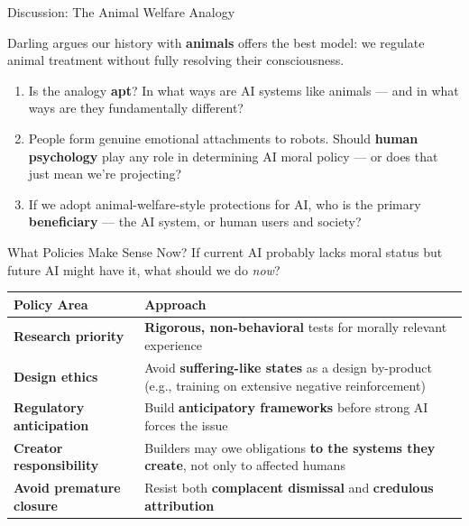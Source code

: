 \documentclass[aspectratio=169,11pt]{beamer}
\begin{document}
\begin{frame}{Discussion: The Animal Welfare Analogy}
\begin{discussionbox}[Discussion]
\small
Darling argues our history with \textbf{animals} offers the best model: we regulate animal treatment without fully resolving their consciousness.
\begin{enumerate}
    \item Is the analogy \textbf{apt}? In what ways are AI systems like animals --- and in what ways are they fundamentally different?
    \item People form genuine emotional attachments to robots. Should \textbf{human psychology} play any role in determining AI moral policy --- or does that just mean we're projecting?
    \item If we adopt animal-welfare-style protections for AI, who is the primary \textbf{beneficiary} --- the AI system, or human users and society?
\end{enumerate}
\end{discussionbox}
\end{frame}

\begin{frame}[shrink=8]{What Policies Make Sense Now?}
If current AI probably lacks moral status but future AI might have it, what should we do \emph{now}?

\begin{tabular}{@{}p{3.8cm}p{7.8cm}@{}}
\toprule
\textbf{Policy Area} & \textbf{Approach} \\
\midrule
\textbf{Research priority} & \textbf{Rigorous, non-behavioral} tests for morally relevant experience \\
\addlinespace
\textbf{Design ethics} & Avoid \textbf{suffering-like states} as a design by-product (e.g., training on extensive negative reinforcement) \\
\addlinespace
\textbf{Regulatory anticipation} & Build \textbf{anticipatory frameworks} before strong AI forces the issue \\
\addlinespace
\textbf{Creator responsibility} & Builders may owe obligations \textbf{to the systems they create}, not only to affected humans \\
\addlinespace
\textbf{Avoid premature closure} & Resist both \textbf{complacent dismissal} and \textbf{credulous attribution} \\
\bottomrule
\end{tabular}
\end{frame}
\end{document}
